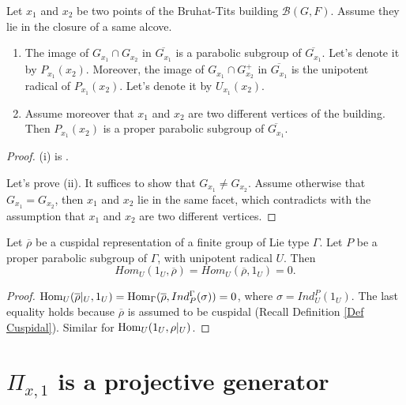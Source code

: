 	
	\begin{lemma}\label{Lem Passage to Residue Field}
		Let $x_1$ and $x_2$ be two points of the Bruhat-Tits building $\mathcal{B}(G, F)$. Assume they lie in the closure of a same alcove.
		\begin{enumerate}
			\item[(i)]   The image of $G_{x_1} \cap G_{x_2}$ in $\overline{G_{x_1}}$ is a parabolic subgroup of $\overline{G_{x_1}}$. Let's denote it by $P_{x_1}(x_2)$. Moreover, the image of $G_{x_1} \cap G_{x_2}^+$ in $\overline{G_{x_1}}$ is the unipotent radical of $P_{x_1}(x_2)$. Let's denote it by $U_{x_1}(x_2)$.
			\item[(ii)] 	Assume moreover that $x_1$ and $x_2$ are two different vertices of the building. Then $P_{x_1}(x_2)$ is a proper parabolic subgroup of $\overline{G_{x_1}}$.
		\end{enumerate}
	\end{lemma}
	
	\begin{proof}
		(i) is \cite[II.5.1.(k)]{vigneras1996representations}.
		
		Let's prove (ii). It suffices to show that $G_{x_1} \neq G_{x_2}$. Assume otherwise that $G_{x_1}=G_{x_2}$, then $x_1$ and $x_2$ lie in the same facet, which contradicts with the assumption that $x_1$ and $x_2$ are two different vertices.
	\end{proof}
	
	\begin{lemma}\label{Lem Hom_U(1_U, cusp)}
		Let $\overline{\rho}$ be a cuspidal representation of a finite group of Lie type $\Gamma$. Let $P$ be a proper parabolic subgroup of $\Gamma$, with unipotent radical $U$. Then
		$$Hom_U(1_U, \overline{\rho})=Hom_U(\overline{\rho}, 1_U)=0.$$
	\end{lemma}
	
	\begin{proof}
		$\operatorname{\operatorname{Hom}}_U(\overline{\rho}|_U, 1_U)=\operatorname{\operatorname{Hom}}_{\Gamma}(\overline{\rho}, Ind_P^{\Gamma}(\sigma))=0$, where $\sigma=Ind_U^P(1_U)$. The last equality holds because $\overline{\rho}$ is assumed to be cuspidal (Recall Definition \ref{Def Cuspidal}). Similar for $\operatorname{\operatorname{Hom}}_U(1_U, \rho|_U)$.
	\end{proof}
	
	
	
	
	\section{$\Pi_{x,1}$ is a projective generator}\label{Section projective generator}
	
